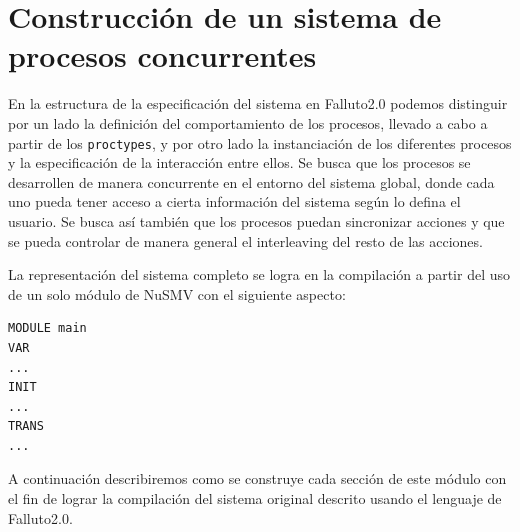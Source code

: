 \documentclass[pdftex,a4paper,12pt]{book}
\begin{document}
\section{Construcci\'on de un sistema de procesos concurrentes}
En la estructura de la especificaci\'on del sistema en Falluto2.0 podemos distinguir por un lado la definici\'on del comportamiento de los procesos, lle\-va\-do a cabo a partir de los \texttt{proctypes}, y por otro lado la instanciaci\'on de los diferentes procesos y la especificaci\'on de la interacci\'on entre ellos. Se busca que los procesos se desarrollen de manera concurrente en el entorno del sistema global, donde cada uno pueda tener acceso a cierta informaci\'on del sistema seg\'un lo defina el usuario. Se busca as\'i tambi\'en que los procesos puedan sincronizar acciones y que se pueda controlar de manera general el interleaving del resto de las acciones.

La representaci\'on del sistema completo se logra en la compilaci\'on a partir del uso de un solo m\'odulo de NuSMV con el siguiente aspecto:
\begin{verbatim}
MODULE main
VAR
...
INIT
...
TRANS
...
\end{verbatim}
A continuaci\'on describiremos como se construye cada secci\'on de este m\'odulo con el fin de lograr la compilaci\'on del sistema original descrito usando el lenguaje de Falluto2.0.
\end{document}
